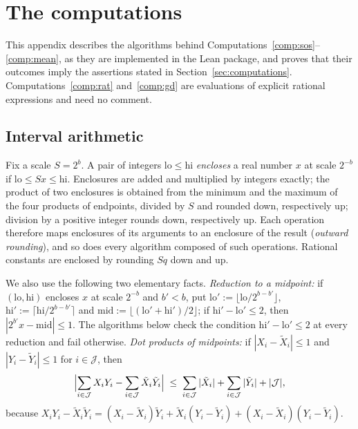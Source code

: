 \documentclass[11pt,reqno]{amsart}
\theoremstyle{definition}
\numberwithin{equation}{section}
\begin{document}
\appendix

\section{The computations}\label{app:comp}

This appendix describes the algorithms behind Computations~\ref{comp:sos}--\ref{comp:mean}, as they are implemented in the Lean package, and proves that their outcomes imply the assertions stated in Section~\ref{sec:computations}. Computations~\ref{comp:rat} and~\ref{comp:gd} are evaluations of explicit rational expressions and need no comment.

\subsection{Interval arithmetic}\label{app:interval}
Fix a scale $S=2^{b}$. A pair of integers $\mathrm{lo}\le\mathrm{hi}$ \emph{encloses} a real number $x$ at scale $2^{-b}$ if $\mathrm{lo}\le Sx\le\mathrm{hi}$. Enclosures are added and multiplied by integers exactly; the product of two enclosures is obtained from the minimum and the maximum of the four products of endpoints, divided by $S$ and rounded down, respectively up; division by a positive integer rounds down, respectively up. Each operation therefore maps enclosures of its arguments to an enclosure of the result (\emph{outward rounding}), and so does every algorithm composed of such operations. Rational constants are enclosed by rounding $Sq$ down and up.

We also use the following two elementary facts. \emph{Reduction to a midpoint:} if $(\mathrm{lo},\mathrm{hi})$ encloses $x$ at scale $2^{-b}$ and $b'<b$, put $\mathrm{lo}':=\lfloor\mathrm{lo}/2^{b-b'}\rfloor$, $\mathrm{hi}':=\lceil\mathrm{hi}/2^{b-b'}\rceil$ and $\mathrm{mid}:=\lfloor(\mathrm{lo}'+\mathrm{hi}')/2\rfloor$; if $\mathrm{hi}'-\mathrm{lo}'\le2$, then $|2^{b'}x-\mathrm{mid}|\le1$. The algorithms below check the condition $\mathrm{hi}'-\mathrm{lo}'\le2$ at every reduction and fail otherwise. \emph{Dot products of midpoints:} if $|X_i-\tilde X_i|\le1$ and $|Y_i-\tilde Y_i|\le1$ for $i\in\mathcal{J}$, then
\begin{equation}\label{eq:dot-err}
  \Bigl|\sum_{i\in\mathcal{J}}X_iY_i-\sum_{i\in\mathcal{J}}\tilde X_i\tilde Y_i\Bigr|\;\le\;\sum_{i\in\mathcal{J}}|\tilde X_i|+\sum_{i\in\mathcal{J}}|\tilde Y_i|+|\mathcal{J}| ,
\end{equation}
because $X_iY_i-\tilde X_i\tilde Y_i=(X_i-\tilde X_i)\tilde Y_i+\tilde X_i(Y_i-\tilde Y_i)+(X_i-\tilde X_i)(Y_i-\tilde Y_i)$.
\end{document}
